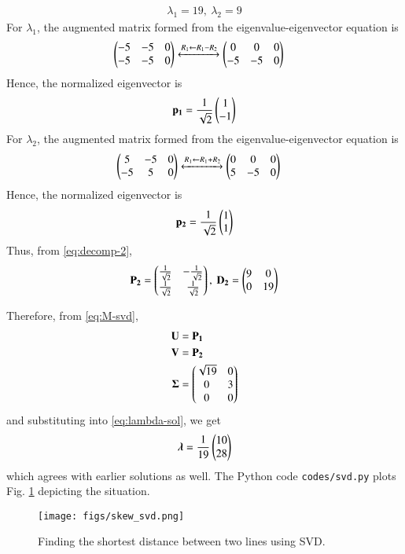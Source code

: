 \documentclass[journal,12pt,twocolumn]{IEEEtran}
\renewcommand{\vec}[1]{\boldsymbol{\mathbf{#1}}}
\begin{document}
\begin{enumerate}
\begin{enumerate}
        \begin{align}
            \lambda_1 = 19,\ \lambda_2 = 9
        \end{align}
        For $\lambda_1$, the augmented matrix formed from the 
        eigenvalue-eigenvector equation is
        \begin{align}
            \begin{pmatrix}-5&-5&0\\-5&-5&0\end{pmatrix} &\xleftrightarrow[]{R_1 \leftarrow R_1-R_2} \begin{pmatrix}0&0&0\\-5&-5&0\end{pmatrix}
        \end{align}
        Hence, the normalized eigenvector is
        \begin{align}
            \vec{p_1} = \frac{1}{\sqrt{2}}\myvec{1\\-1}
        \end{align}
        For $\lambda_2$, the augmented matrix formed from the 
        eigenvalue-eigenvector equation is
        \begin{align}
            \begin{pmatrix}5&-5&0\\-5&5&0\end{pmatrix} &\xleftrightarrow[]{R_1 \leftarrow R_1+R_2} \begin{pmatrix}0&0&0\\5&-5&0\end{pmatrix}
        \end{align}
        Hence, the normalized eigenvector is
        \begin{align}
            \vec{p_2} = \frac{1}{\sqrt{2}}\myvec{1\\1}
        \end{align}
        Thus, from \eqref{eq:decomp-2},
        \begin{align}
            \vec{P_2} = \myvec{\frac{1}{\sqrt{2}}&-\frac{1}{\sqrt{2}}\\\frac{1}{\sqrt{2}}&\frac{1}{\sqrt{2}}},\ \vec{D_2} = \myvec{9&0\\0&19}
            \label{eq:eig-params-2}
        \end{align}
    \end{enumerate}
    Therefore, from \eqref{eq:M-svd},
    \begin{align}
        \vec{U} &= \vec{P_1} \\ 
        \vec{V} &= \vec{P_2} \\
        \vec{\Sigma} &= \myvec{\sqrt{19}&0\\0&3\\0&0}
        \label{eq:svd-params}
    \end{align}
    and substituting into \eqref{eq:lambda-sol}, we get
    \begin{align}
        \vec{\lambda} = \frac{1}{19}\myvec{10\\28}
    \end{align}
    which agrees with earlier solutions as well. The Python code
    \texttt{codes/svd.py} plots Fig. \ref{fig:svd} depicting the situation.
    \begin{figure}[H]
        \centering
        \texttt{[image: figs/skew\_svd.png]}
        \caption{Finding the shortest distance between two lines using SVD.}
        \label{fig:svd}
    \end{figure}
\end{enumerate}
\end{document}
